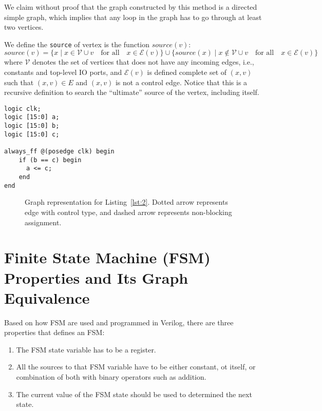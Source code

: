 \documentclass{article}
\begin{document}
We claim without proof that the graph
constructed by this method is a directed simple graph, which implies that any loop
in the graph has to go through at least two vertices.

We define the \texttt{source} of vertex is the function $source(v)$:
\[
    source(v) = \{x \mid x \in \mathcal{V} \cup {v}\quad\text{for all}\quad x \in \mathcal{E}(v) \} \cup 
                \{source(x) \mid x \not \in \mathcal{V} \cup {v}\quad\text{for all}\quad x \in \mathcal{E}(v)\}
\]
where $\mathcal{V}$ denotes the set of vertices that does not have any incoming edges,
i.e., constants and top-level IO ports, and $\mathcal{E}(v)$ is defined complete
set of $(x, v)$ such that $(x, v) \in E$ and $(x, v)$ is not a control edge.
Notice that this is a recursive definition to search the ``ultimate'' source of the
vertex, including itself.

\begin{lstlisting}[style={verilog-style}, caption={Control vertex and non-blocking
    assignment Verilog code},
    label={lst:2}]
logic clk;
logic [15:0] a;
logic [15:0] b;
logic [15:0] c;

always_ff @(posedge clk) begin
    if (b == c) begin
      a <= c;
    end
end
\end{lstlisting}

\begin{figure}
    \centering
    \begin{tikzpicture}
    
    \end{tikzpicture}
    \caption{Graph representation for Listing~\ref{lst:2}. Dotted arrow represents edge with control
    type, and dashed arrow represents non-blocking assignment.}
    \label{fig:2}
\end{figure}

\section{Finite State Machine (FSM) Properties and Its Graph Equivalence}
Based on how FSM are used and programmed in Verilog, there are three properties that
defines an FSM:
\begin{enumerate}
    \item The FSM state variable has to be a register.
    \item All the sources to that FSM variable have to be either constant, ot itself,
    or combination of both with binary operators such as addition.
    \item The current value of the FSM state should be used to determined the next
    state.
\end{enumerate}
\end{document}
